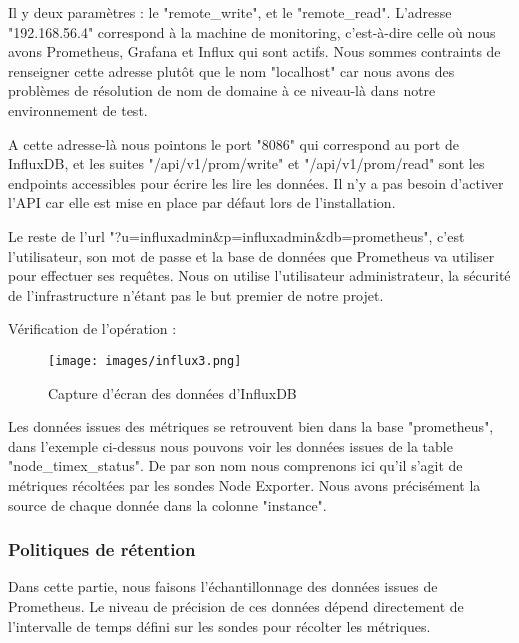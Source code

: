 \documentclass[oneside,12pt]{report}
\begin{document}
Il y deux paramètres : le "remote\_write", et le "remote\_read". L'adresse "192.168.56.4" correspond à la machine de monitoring, c'est-à-dire celle où nous avons Prometheus, Grafana et Influx qui sont actifs. Nous sommes contraints de renseigner cette adresse plutôt que le nom "localhost" car nous avons des problèmes de résolution de nom de domaine à ce niveau-là dans notre environnement de test. \newline

A cette adresse-là nous pointons le port "8086" qui correspond au port de InfluxDB, et les suites "/api/v1/prom/write" et "/api/v1/prom/read" sont les endpoints accessibles pour écrire les lire les données. Il n'y a pas besoin d'activer l'API car elle est mise en place par défaut lors de l'installation.\newline

Le reste de l'url "?u=influxadmin\&p=influxadmin\&db=prometheus", c'est l'utilisateur, son mot de passe et la base de données que Prometheus va utiliser pour effectuer ses requêtes. Nous on utilise l'utilisateur administrateur, la sécurité de l'infrastructure n'étant pas le but premier de notre projet.\newline

Vérification de l'opération :\newline
\begin{figure}[H]
    \centering
    \texttt{[image: images/influx3.png]}
    \caption{Capture d'écran des données d'InfluxDB}
    \label{fig:mesh1}
\end{figure}
Les données issues des métriques se retrouvent bien dans la base "prometheus", dans l'exemple ci-dessus nous pouvons voir les données issues de la table "node\_timex\_status". De par son nom nous comprenons ici qu'il s'agit de métriques récoltées par les sondes Node Exporter. Nous avons précisément la source de chaque donnée dans la colonne "instance".\newline

\subsubsection{Politiques de rétention}

Dans cette partie, nous faisons l'échantillonnage  des données issues de Prometheus. Le niveau de précision de ces données dépend directement de l'intervalle de temps défini sur les sondes pour récolter les métriques. \newline
\end{document}
